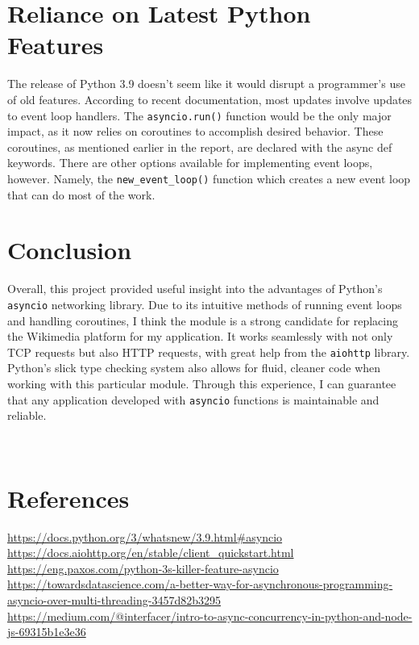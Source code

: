\section{Reliance on Latest Python Features}

The release of Python 3.9 doesn't seem like it would disrupt a programmer's use of old features. According to recent documentation, most updates involve updates to event loop handlers. The \verb +asyncio.run()+ function would be the only major impact, as it now relies on coroutines to accomplish desired behavior. These coroutines, as mentioned earlier in the report, are declared with the async def keywords. There are other options available for implementing event loops, however. Namely, the \verb +new_event_loop()+ function which creates a new event loop that can do most of the work.  


\section{Conclusion}
Overall, this project provided useful insight into the advantages of Python's \verb +asyncio+ networking library. Due to its intuitive methods of running event loops and handling coroutines, I think the module is a strong candidate for replacing the Wikimedia platform for my application. It works seamlessly with not only TCP requests but also HTTP requests, with great help from the \verb +aiohttp+ library. Python's slick type checking system also allows for fluid, cleaner code when working with this particular module. Through this experience, I can guarantee that any application developed with \verb +asyncio+ functions is maintainable and reliable. 


\ 
\section{References}

\url {https://docs.python.org/3/whatsnew/3.9.html#asyncio} \\
\url {https://docs.aiohttp.org/en/stable/client_quickstart.html}\\
\url {https://eng.paxos.com/python-3s-killer-feature-asyncio}\\
\url {https://towardsdatascience.com/a-better-way-for-asynchronous-programming-asyncio-over-multi-threading-3457d82b3295}\\
\url {https://medium.com/@interfacer/intro-to-async-concurrency-in-python-and-node-js-69315b1e3e36}\\














